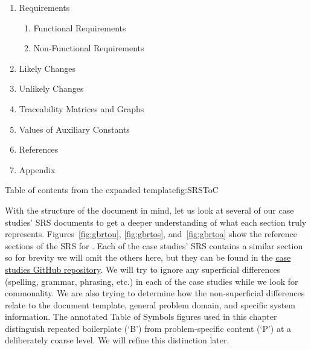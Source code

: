 {\begin{center}
\begin{enumerate}[nosep, label*=\arabic*.]
\begin{enumerate}[nosep, label*=\arabic*.]
  \item Problem Description
\begin{enumerate}[nosep, label*=\arabic*.]
    \item Physical System Description
    \item Goal Statements
\end{enumerate}
  \item Solution Characteristics Specification
\begin{enumerate}[nosep, label*=\arabic*.]
    \item Assumptions
    \item Theoretical Models
    \item General Definitions
    \item Data Definitions
    \item Instance Models
    \item Data Constraints
    \item Properties of a Correct Solution
\end{enumerate}
\end{enumerate}
\item Requirements
\begin{enumerate}[nosep, label*=\arabic*.]
  \item Functional Requirements
  \item Non-Functional Requirements         
\end{enumerate}
\item Likely Changes
\item Unlikely Changes
\item Traceability Matrices and Graphs
\item Values of Auxiliary Constants
\item References
\item Appendix
\end{enumerate}
  \end{center}
}{Table of contents from the expanded \smithea{} template}{fig:SRSToC}

With the structure of the document in mind, let us look at several of our case
studies' SRS documents to get a deeper understanding of what each section truly
represents. Figures~\ref{fig:gbrtou}, \ref{fig:gbrtos}, 
and~\ref{fig:gbrtoa} show the reference sections of the SRS for \gb. Each of 
the case studies' SRS contains a similar section so for 
brevity we will omit the others here, but they can be found in the
\href{https://github.com/smiths/caseStudies}{case studies GitHub repository}.
We will try to ignore any superficial differences (spelling, 
grammar, phrasing, etc.) in each of the case studies while we look for 
commonality. We are also trying to determine how the non-superficial 
differences relate to the document template, general problem domain, and 
specific system information. The annotated Table of Symbols figures used in this
chapter distinguish repeated boilerplate (`B') from problem-specific content (`P')
at a deliberately coarse level. We will refine this distinction later.

